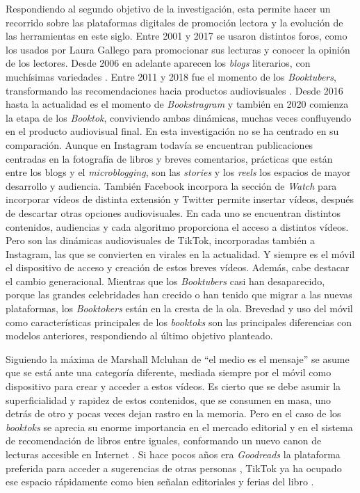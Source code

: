 Respondiendo al segundo objetivo de la investigación, esta permite hacer
un recorrido sobre las plataformas digitales de promoción lectora y la
evolución de las herramientas en este siglo. Entre 2001 y 2017 se usaron
distintos foros, como los usados por Laura Gallego \cite{lluch2012}
para promocionar sus lecturas y conocer la opinión de los lectores.
Desde 2006 en adelante aparecen los \emph{blogs} literarios, con
muchísimas variedades \cite{garcia2014}. Entre 2011
y 2018 fue el momento de los \emph{Booktubers}, transformando las
recomendaciones hacia productos audiovisuales \cite{tomasena2021}. Desde
2016 hasta la actualidad es el momento de \emph{Bookstragram} \cite{quilescabrera2020} y también en 2020 comienza la etapa de los
\emph{Booktok}, conviviendo ambas dinámicas, muchas veces confluyendo en
el producto audiovisual final. En esta investigación no se ha centrado
en su comparación. Aunque en Instagram todavía se encuentran
publicaciones centradas en la fotografía de libros y breves comentarios,
prácticas que están entre los blogs y el \emph{microblogging}, son las
\emph{stories} y los \emph{reels} los espacios de mayor desarrollo y
audiencia. También Facebook incorpora la sección de \emph{Watch} para
incorporar vídeos de distinta extensión y Twitter permite insertar
vídeos, después de descartar otras opciones audiovisuales. En cada uno
se encuentran distintos contenidos, audiencias y cada algoritmo
proporciona el acceso a distintos vídeos. Pero son las dinámicas
audiovisuales de TikTok, incorporadas también a Instagram, las que se
convierten en virales en la actualidad. Y siempre es el móvil el
dispositivo de acceso y creación de estos breves vídeos. Además, cabe
destacar el cambio generacional. Mientras que los \emph{Booktubers} casi
han desaparecido, porque las grandes celebridades han crecido o han
tenido que migrar a las nuevas plataformas, los \emph{Booktokers} están
en la cresta de la ola. Brevedad y uso del móvil como características
principales de los \emph{booktoks} son las principales diferencias con
modelos anteriores, respondiendo al último objetivo planteado.

Siguiendo la máxima de Marshall Mcluhan de ``el medio es el mensaje'' se
asume que se está ante una categoría diferente, mediada siempre por el
móvil como dispositivo para crear y acceder a estos vídeos. Es cierto
que se debe asumir la superficialidad y rapidez de estos contenidos, que
se consumen en masa, uno detrás de otro y pocas veces dejan rastro en la
memoria. Pero en el caso de los \emph{booktoks} se aprecia su enorme
importancia en el mercado editorial y en el sistema de recomendación de
libros entre iguales, conformando un nuevo canon de lecturas accesible
en Internet \cite{lluch2021}. Si hace pocos años era \emph{Goodreads} la
plataforma preferida para acceder a sugerencias de otras personas
\cite{garcia-roca2020}, TikTok ya ha ocupado ese espacio rápidamente como
bien señalan editoriales y ferias del libro \cite{penguin2020}.


